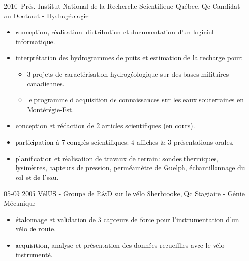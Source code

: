 \documentclass[]{friggos-cv} %
\begin{document}
\begin{entrylist}
  \entryBul
    {2010--Prés.}
    {Institut National de la Recherche Scientifique}
    {Québec, Qc}
    {Candidat au Doctorat - Hydrogéologie}
    {
     \begin{itemize}[leftmargin=*]
       \setlength\itemsep{0pt}
       \item conception, réalisation, distribution et documentation d'un logiciel informatique.                      
       \item interprétation des hydrogrammes de puits et estimation de la recharge pour:
         \begin{itemize}[leftmargin=0.5cm]
           \item 3 projets de caractérisation hydrogéologique sur des bases militaires canadiennes.
           \item le programme d’acquisition de connaissances sur les eaux souterraines en Montérégie-Est.
         \end{itemize}
       \item conception et rédaction de 2 articles scientifiques (en cours).
       \item participation à 7 congrès scientifiques: 4 affiches \& 3 présentations orales.
       \item planification et réalisation de travaux de terrain: sondes thermiques, lysimètres, capteurs de pression, perméamètre de Guelph, échantillonnage du sol et de l'eau.
     \end{itemize}
     }
\end{entrylist}
\begin{entrylist}
  \entryBul
    {05-09 2005}
    {VélUS - Groupe de R\&D sur le vélo}
    {Sherbrooke, Qc}
    {Stagiaire - Génie Mécanique}
    {
     \begin{itemize}[leftmargin=*]
       \setlength\itemsep{0pt}
       \item étalonnage et validation de 3 capteurs de force pour l'instrumentation d'un vélo de route.
       \item acquisition, analyse et présentation des données recueillies avec le vélo instrumenté.
     \end{itemize}
     }
\end{entrylist}
\end{document}
